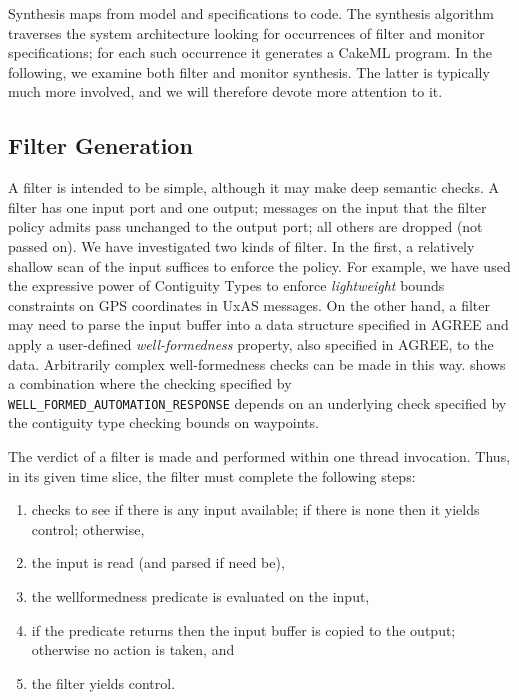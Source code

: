 Synthesis maps from model and specifications to code. The synthesis
algorithm traverses the system architecture looking for occurrences of
filter and monitor specifications;  for each such occurrence it
generates a CakeML program. In the following, we examine both filter
and monitor synthesis. The latter is typically much more involved, and
we will therefore devote more attention to it.

\subsection{Filter Generation}

A filter is intended to be simple, although it may make deep semantic
checks. A filter has one input port and one output; messages on the
input that the filter policy admits pass unchanged to the output port;
all others are dropped (not passed on). We have investigated two kinds
of filter. In the first, a relatively shallow scan of the input
suffices to enforce the policy. For example, we have used the
expressive power of Contiguity Types \cite{contiguity-types} to
enforce \emph{lightweight} bounds constraints on GPS coordinates in
UxAS messages. On the other hand, a filter may need to parse the input
buffer into a data structure specified in AGREE and apply a
user-defined \emph{well-formedness} property, also specified in AGREE,
to the data. Arbitrarily complex well-formedness checks can be made in
this way.  shows a combination where the
checking specified by {\small\verb+WELL_FORMED_AUTOMATION_RESPONSE+}
depends on an underlying check specified by the contiguity type
checking bounds on waypoints.

The verdict of a filter is made and performed within one thread
invocation. Thus, in its given time slice, the filter must complete the
following steps:

\begin{enumerate}

\item checks to see if there is any input available; if there is none
then it yields control; otherwise,

\item the input is read (and parsed if need be),

\item the wellformedness predicate is evaluated on the input,

\item if the predicate returns  then the input buffer
 is copied to the output; otherwise no action is taken, and

\item the filter yields control.
\end{enumerate}

